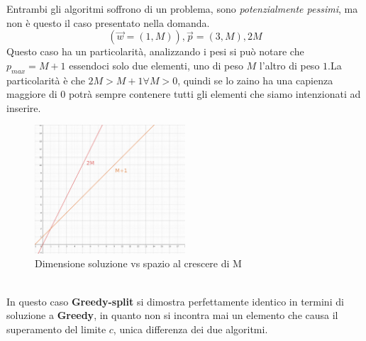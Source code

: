 \documentclass[a4paper]{article}
\begin{document}
Entrambi gli algoritmi soffrono di un problema, sono \textit{potenzialmente pessimi}, ma non è questo il caso presentato nella domanda.
$$(\vec w = (1,M)), \vec p = (3,M), 2M$$
Questo caso ha un particolarità, analizzando i pesi si può notare che $p_{max} = M +1$ essendoci solo due elementi, uno di peso $M$ l'altro di peso $1$.La particolarità è che $2M > M + 1 \forall M > 0$, quindi se lo zaino ha una capienza maggiore di $0$ potrà sempre contenere tutti gli elementi che siamo intenzionati ad inserire.
\begin{figure}[!ht]
\centering
\includegraphics[width=0.5\textwidth]{./img/C_8.png}
\caption{Dimensione soluzione vs spazio al crescere di M} \label{FIG:C_8}
\end{figure}\\
In questo caso \textbf{Greedy-split} si dimostra perfettamente identico in termini di soluzione a \textbf{Greedy}, in quanto non si incontra mai un elemento che causa il superamento del limite $c$, unica differenza dei due algoritmi.
\end{document}
